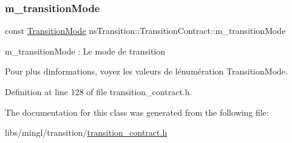 \subsubsection{\texorpdfstring{m\+\_\+transition\+Mode}{m\_transitionMode}}
{\footnotesize\ttfamily const \hyperlink{classns_transition_1_1_transition_contract_a40118ebf3c1a0a486934ce2b9ddc3edb}{Transition\+Mode} ns\+Transition\+::\+Transition\+Contract\+::m\+\_\+transition\+Mode\hspace{0.3cm}{\ttfamily [protected]}}



m\+\_\+transition\+Mode \+: Le mode de transition 

Pour plus d\textquotesingle{}informations, voyez les valeurs de l\textquotesingle{}énumération Transition\+Mode. 

Definition at line 128 of file transition\+\_\+contract.\+h.



The documentation for this class was generated from the following file\+:\begin{DoxyCompactItemize}
\item 
libs/mingl/transition/\hyperlink{transition__contract_8h}{transition\+\_\+contract.\+h}\end{DoxyCompactItemize}

